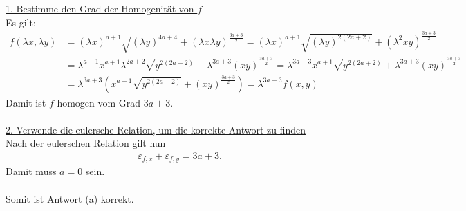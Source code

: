 \underline{1. Bestimme den Grad der Homogenität von $ f $}\\
Es gilt:
\begin{align*}
f(\lambda x , \lambda y)
&=
(\lambda x )^{a+1} \sqrt{(\lambda y)^{4a +4}} + (\lambda x \lambda y)^{\frac{3a +3}{2}}
=
(\lambda x )^{a+1} \sqrt{(\lambda y)^{2(2a +2)}} + (\lambda^2 x  y)^{\frac{3a +3}{2}}\\
&=
\lambda^{a+1} x^{a+1} \lambda^{2a +2} \sqrt{ y^{2(2a +2)}} + \lambda^{3a + 3}( x  y)^{\frac{3a +3}{2}}
=
\lambda^{3a+3} x^{a+1}  \sqrt{ y^{2(2a +2)}} + \lambda^{3a + 3}( x  y)^{\frac{3a +3}{2}}\\
&=
\lambda^{3a +3}
\left(
x^{a+1}  \sqrt{ y^{2(2a +2)}} +( x  y)^{\frac{3a +3}{2}}
\right)
= \lambda^{3a +3} f(x,y)
\end{align*}
Damit ist $ f $ homogen vom Grad $ 3a +3 $.
\\
\\
\underline{2. Verwende die eulersche Relation, um die korrekte Antwort zu finden}\\
Nach der eulerschen Relation gilt nun
\begin{align*}
\varepsilon_{f,x}+ \varepsilon_{f,y} = 3 a + 3.
\end{align*}
Damit muss $ a = 0  $ sein.\\
\\
Somit ist Antwort (a) korrekt.
